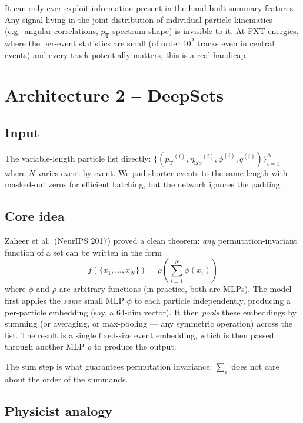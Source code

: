 \documentclass[11pt]{article}
\newcommand{\pT}{\ensuremath{p_{\text{T}}}}
\newcommand{\etalab}{\ensuremath{\eta_{\text{lab}}}}
\begin{document}
It can only ever exploit information present in the hand-built summary
features. Any signal living in the joint distribution of individual
particle kinematics (e.g.\ angular correlations, $\pT$ spectrum shape)
is invisible to it. At FXT energies, where the per-event statistics
are small (of order $10^2$ tracks even in central events) and every
track potentially matters, this is a real handicap.

\section{Architecture 2 -- DeepSets}
\label{sec:deepsets}

\subsection{Input}

The variable-length particle list directly:
$\{(\pT^{(i)}, \etalab^{(i)}, \phi^{(i)}, q^{(i)})\}_{i=1}^N$
where $N$ varies event by event. We pad shorter events to the same
length with masked-out zeros for efficient batching, but the network
ignores the padding.

\subsection{Core idea}

Zaheer et al.\ (NeurIPS 2017) proved a clean theorem: \emph{any}
permutation-invariant function of a set can be written in the form
\[
   f(\{x_1, \dots, x_N\}) = \rho\!\left(\sum_{i=1}^N \phi(x_i)\right)
\]
where $\phi$ and $\rho$ are arbitrary functions (in practice, both are
MLPs). The model first applies the \emph{same} small MLP $\phi$ to
each particle independently, producing a per-particle embedding (say,
a 64-dim vector). It then \emph{pools} these embeddings by summing
(or averaging, or max-pooling --- any symmetric operation) across the
list. The result is a single fixed-size event embedding, which is
then passed through another MLP $\rho$ to produce the output.

The sum step is what guarantees permutation invariance: $\sum_i$ does
not care about the order of the summands.

\subsection{Physicist analogy}
\end{document}
